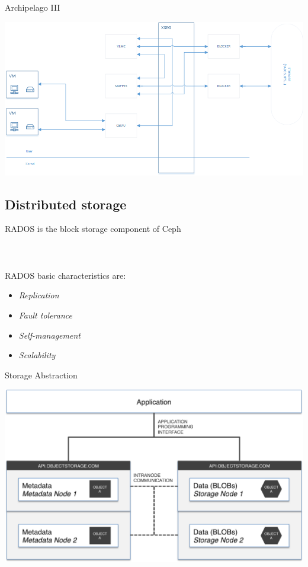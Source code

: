\begin{frame}{Archipelago III}
\begin{center}
    \includegraphics[scale=0.4]{images/archip-comm.png} \\
\end{center}
\end{frame}

\subsection{Distributed storage}

\begin{frame}{RADOS}
is the block storage component of Ceph 
\hfill \\
\hfill \\
\hfill \\
\hfill \\

RADOS basic characteristics are:
\begin{itemize}
\item \textit{Replication}
\item \textit{Fault tolerance}
\item \textit{Self-management}
\item \textit{Scalability}\end{itemize}
\end{frame}


\begin{frame}{Storage Abstraction}
\begin{center}
    \includegraphics[scale=0.4]{images/object_storage_arch.png} \\
\end{center}
\end{frame}

